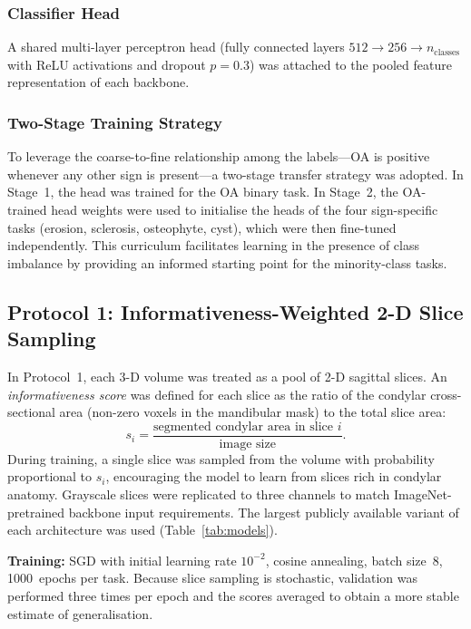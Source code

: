 \documentclass[review,12pt]{elsarticle}
\begin{document}
\subsubsection{Classifier Head}

A shared multi-layer perceptron head (fully connected layers
$512 \to 256 \to n_\text{classes}$ with ReLU activations and dropout
$p = 0.3$) was attached to the pooled feature representation of each
backbone.

\subsubsection{Two-Stage Training Strategy}

To leverage the coarse-to-fine relationship among the labels---OA is
positive whenever any other sign is present---a two-stage transfer
strategy was adopted. In Stage~1, the head was trained for the OA binary
task. In Stage~2, the OA-trained head weights were used to initialise
the heads of the four sign-specific tasks (erosion, sclerosis, osteophyte,
cyst), which were then fine-tuned independently. This curriculum
facilitates learning in the presence of class imbalance by providing an
informed starting point for the minority-class tasks.

\subsection{Protocol 1: Informativeness-Weighted 2-D Slice Sampling}
\label{sec:proto1}

In Protocol~1, each 3-D volume was treated as a pool of 2-D sagittal
slices. An \emph{informativeness score} was defined for each slice as
the ratio of the condylar cross-sectional area (non-zero voxels in the
mandibular mask) to the total slice area:
\begin{equation}
  s_i = \frac{\text{segmented condylar area in slice } i}{\text{image size}}.
  \label{eq:info}
\end{equation}
During training, a single slice was sampled from the volume with
probability proportional to $s_i$, encouraging the model to learn from
slices rich in condylar anatomy. Grayscale slices were replicated to
three channels to match ImageNet-pretrained backbone input requirements.
The largest publicly available variant of each architecture was used
(Table~\ref{tab:models}).

\textbf{Training:} SGD with initial learning rate $10^{-2}$, cosine
annealing, batch size~8, 1000~epochs per task. Because slice sampling
is stochastic, validation was performed three times per epoch and the
scores averaged to obtain a more stable estimate of generalisation.
\end{document}
